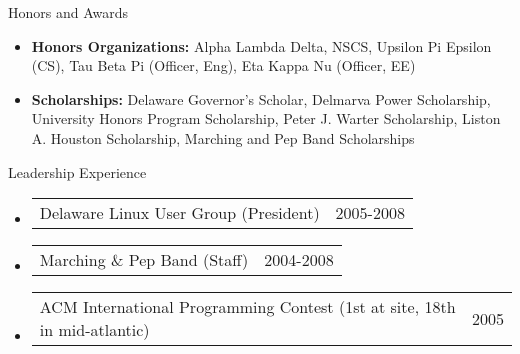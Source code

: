\documentclass[letterpaper,10pt]{article}
\makeatletter
\newenvironment{ressection}[1]{
	\vspace{4pt}
	{\fontfamily{phv}\selectfont\Large#1}
	\begin{itemize}
	\vspace{3pt}
}{
	\end{itemize}
}
\newcommand{\resitem}[1]{
	\vspace{-4pt}
	\item \begin{flushleft} #1 \end{flushleft}
}
\newcommand{\reslongitem}[2]{
	\vspace{-4pt}
	\item
	\begin{tabular*}{6in}{l@{\extracolsep{\fill}}r}
		#1 & #2 \\
	\end{tabular*}
}
\makeatother
\begin{document}
\begin{ressection}{Honors and Awards}
	\resitem{\textbf{Honors Organizations:} Alpha Lambda Delta, NSCS, Upsilon Pi Epsilon (CS), Tau Beta Pi (Officer, Eng), Eta Kappa Nu (Officer, EE)}
	\resitem{\textbf{Scholarships:} Delaware Governor's Scholar, Delmarva Power Scholarship, University Honors Program Scholarship, Peter J. Warter Scholarship, Liston A. Houston Scholarship, Marching and Pep Band Scholarships}
\end{ressection}

\begin{ressection}{Leadership Experience}
	\reslongitem{Delaware Linux User Group (President)}{2005-2008}
	\reslongitem{Marching \& Pep Band (Staff)}{2004-2008}
	\reslongitem{ACM International Programming Contest (1st at site, 18th in mid-atlantic)}{2005}
\end{ressection}
\end{document}
